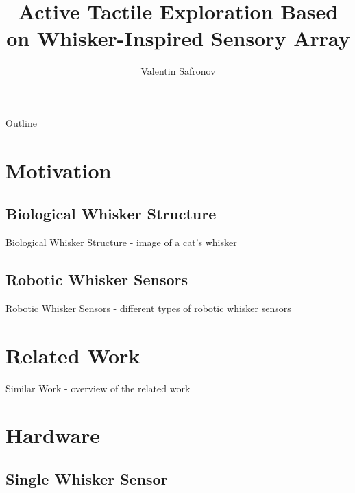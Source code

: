\documentclass[AIRbeamer
,optEnglish
,optBiber
,optBibstyleAlphabetic
,optBeamerClassicFormat%
]{AIRlatex}
\title[Active Tactile Exploration Based on Whisker-Inspired Sensory Array]{Active Tactile Exploration Based on Whisker-Inspired Sensory Array}
\author[Valentin Safronov]{Valentin Safronov}
\date{\AIRutilsDate{28}{03}{2025}}
\begin{document}
    \AIRbeamerTitlePageStudentThesis

    \begin{frame}{Outline}
        \tableofcontents
    \end{frame}


    \section{Motivation}

    \subsection{Biological Whisker Structure}
    \begin{frame}{Biological Whisker Structure}
        - image of a cat's whisker
    \end{frame}

    \subsection{Robotic Whisker Sensors}
    \begin{frame}{Robotic Whisker Sensors}
        - different types of robotic whisker sensors
    \end{frame}


    \section{Related Work}
    \begin{frame}{Similar Work}
        - overview of the related work
    \end{frame}


    \section{Hardware}

    \subsection{Single Whisker Sensor}
\end{document}
